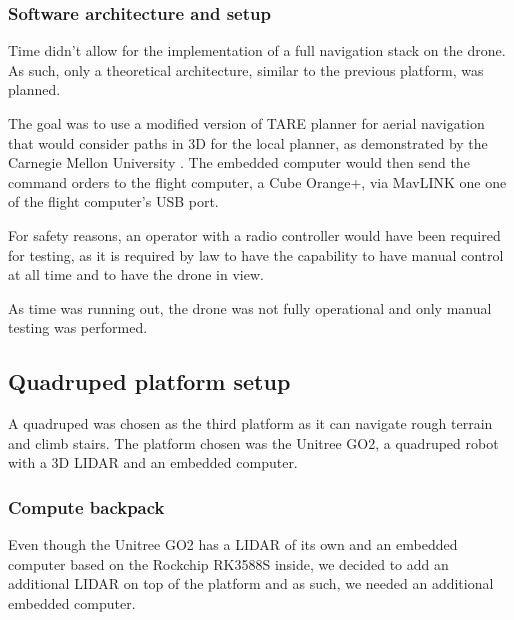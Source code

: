 \documentclass[12pt]{article}
\begin{document}
            \subsubsection{Software architecture and setup}
                
                Time didn't allow for the implementation of a full navigation stack on the drone. As such, only a theoretical architecture, similar to the previous platform, was planned.
                
                The goal was to use a modified version of TARE planner for aerial navigation that would consider paths in 3D for the local planner, as demonstrated by the Carnegie Mellon University \cite{cao2023representation}. The embedded computer would then send the command orders to the flight computer, a Cube Orange+, via MavLINK one one of the flight computer's USB port.

                For safety reasons, an operator with a radio controller would have been required for testing, as it is required by law to have the capability to have manual control at all time and to have the drone in view. 

                As time was running out, the drone was not fully operational and only manual testing was performed.


            
    \subsection{Quadruped platform setup}

        A quadruped was chosen as the third platform as it can navigate rough terrain and climb stairs. The platform chosen was the Unitree GO2, a quadruped robot with a 3D LIDAR and an embedded computer.

        \subsubsection{Compute backpack}

        Even though the Unitree GO2 has a LIDAR of its own and an embedded computer based on the Rockchip RK3588S inside, we decided to add an additional LIDAR on top of the platform and as such, we needed an additional embedded computer.
\end{document}
